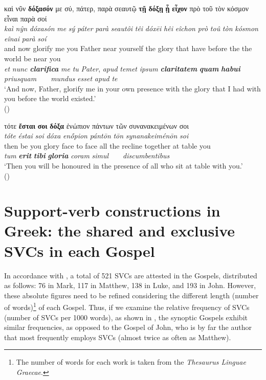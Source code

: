 \documentclass[output=paper,colorlinks,citecolor=brown]{langscibook}
\begin{document}
\gllll καὶ νῦν \textbf{δόξασόν} με σύ, πάτερ, παρὰ σεαυτῷ \textbf{τῇ} \textbf{δόξῃ} \textbf{ᾗ} \textbf{εἶχον} πρὸ τοῦ τὸν κόσμον εἶναι παρὰ σοί\\
 \textit{kaì} \textit{nŷn} \textit{dóxasón} \textit{me} \textit{sý} \textit{páter} \textit{parà} \textit{seautôi} \textit{têi} \textit{dóxēi} \textit{hêi} \textit{eîchon} \textit{prò} \textit{toû} \textit{tòn} \textit{kósmon} \textit{eînai} \textit{parà} \textit{soí}\\
and now glorify me you Father near yourself the glory that have before the the world be near you\\
\emph{et} \emph{nunc} \textbf{\itshape clarifica} \emph{me} \emph{tu} \emph{Pater}, \emph{apud} \emph{temet} \emph{ipsum} \textbf{\itshape claritatem} \textbf{\itshape quam}
\textbf{\itshape habui} \emph{priusquam} ~ ~ \emph{mundus} \emph{esset} \emph{apud} \emph{te}\\
\glt `And now, Father, glorify me in your own presence with the glory that I had with you before the world existed.' \\
\hspace*{\fill}()

\ex\label{ex:bj:8e}

\gllll τότε \textbf{ἔσται} \textbf{σοι} \textbf{δόξα} ἐνώπιον πάντων τῶν συνανακειμένων σοι\\
 \textit{tóte} \textit{éstai} \textit{soi} \textit{dóxa} \textit{enṓpion} \textit{pántōn} \textit{tōn} \textit{synanakeiménōn} \textit{soi}\\
then be you glory {face to face} all the {recline together at table} you\\
\emph{tum} \textbf{\itshape erit} \textbf{\itshape tibi} \textbf{\itshape gloria} {\textit{coram} \emph{simul}} ~ ~ \emph{discumbentibus} \vspace*{-2ex} \\
\glt `Then you will be honoured in the presence of all who sit at table with you.' \\
\hspace*{\fill}()

\z

\z


\section{Support-verb constructions in Greek: the shared and exclusive SVCs in each Gospel}\label{sec:bj:3}

In accordance with , a total of 521 SVCs are
attested in the Gospels, distributed as follows: 76 in Mark, 117 in Matthew, 138 in Luke,
and 193 in John. However, these absolute figures need to be refined considering the
different length (number of words)\footnote{The number of words for each work is taken
  from the \textit{Thesaurus Linguae Graecae}.} of each Gospel. Thus, if we examine the relative frequency of SVCs
(number of SVCs per 1000 words), as shown in , the synoptic Gospels
exhibit similar frequencies, as opposed to the Gospel of John, who is by far the author
that most frequently employs SVCs (almost twice as often as Matthew).
\end{document}

